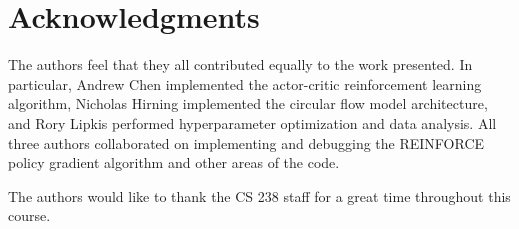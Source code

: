 \documentclass[twoside,twocolumn]{article}
\begin{document}
\section{Acknowledgments}

The authors feel that they all contributed equally to the work presented. In particular, Andrew Chen implemented the actor-critic reinforcement learning algorithm, Nicholas Hirning implemented the circular flow model architecture, and Rory Lipkis performed hyperparameter optimization and data analysis. All three authors collaborated on implementing and debugging the REINFORCE policy gradient algorithm and other areas of the code. 

\medskip

The authors would like to thank the CS 238 staff for a great time throughout this course.





\end{document}
